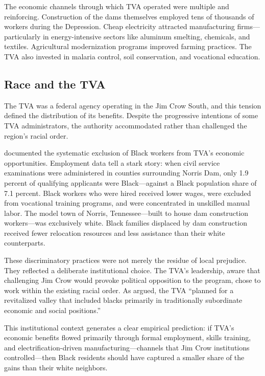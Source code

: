 \documentclass[12pt]{article}
\begin{document}
The economic channels through which TVA operated were multiple and reinforcing. Construction of the dams themselves employed tens of thousands of workers during the Depression. Cheap electricity attracted manufacturing firms---particularly in energy-intensive sectors like aluminum smelting, chemicals, and textiles. Agricultural modernization programs improved farming practices. The TVA also invested in malaria control, soil conservation, and vocational education.

\subsection{Race and the TVA}

The TVA was a federal agency operating in the Jim Crow South, and this tension defined the distribution of its benefits. Despite the progressive intentions of some TVA administrators, the authority accommodated rather than challenged the region's racial order.

\citet{grant1990} documented the systematic exclusion of Black workers from TVA's economic opportunities. Employment data tell a stark story: when civil service examinations were administered in counties surrounding Norris Dam, only 1.9 percent of qualifying applicants were Black---against a Black population share of 7.1 percent. Black workers who were hired received lower wages, were excluded from vocational training programs, and were concentrated in unskilled manual labor. The model town of Norris, Tennessee---built to house dam construction workers---was exclusively white. Black families displaced by dam construction received fewer relocation resources and less assistance than their white counterparts.

These discriminatory practices were not merely the residue of local prejudice. They reflected a deliberate institutional choice. The TVA's leadership, aware that challenging Jim Crow would provoke political opposition to the program, chose to work within the existing racial order. As \citet{grant1990} argued, the TVA ``planned for a revitalized valley that included blacks primarily in traditionally subordinate economic and social positions.''

This institutional context generates a clear empirical prediction: if TVA's economic benefits flowed primarily through formal employment, skills training, and electrification-driven manufacturing---channels that Jim Crow institutions controlled---then Black residents should have captured a smaller share of the gains than their white neighbors.
\end{document}
